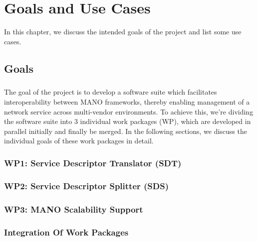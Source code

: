 \chapter{Goals and Use Cases}
\label{ch:Goals and Use Cases}

In this chapter, we discuss the intended goals of the project and list some use cases.

\section{Goals}

\paragraph{}
The goal of the project is to develop a software suite which facilitates interoperability between MANO frameworks, thereby enabling management of a network service across multi-vendor environments. To achieve this, we're dividing the software suite into 3 individual work packages (WP), which are developed in parallel initially and finally be merged. In the following sections, we discuss the individual goals of these work packages in detail.

\subsection{WP1: Service Descriptor Translator (SDT)}
\paragraph{}


\subsection{WP2: Service Descriptor Splitter (SDS)}
\paragraph{}


\subsection{WP3: MANO Scalability Support}
\paragraph{}


\subsection{Integration Of Work Packages}
